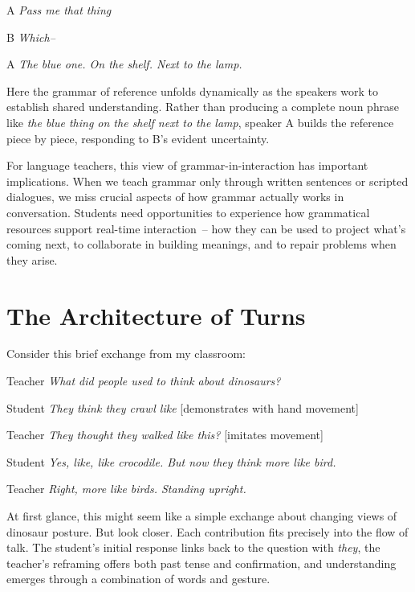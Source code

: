 \ea
\begin{dialogue}
\item[A] \textit{Pass me that thing}
\item[B] \textit{Which--}
\item[A] \textit{The blue one. On the shelf. Next to the lamp.}
\end{dialogue}
\z

Here the grammar of reference unfolds dynamically as the speakers work to establish shared understanding. Rather than producing a complete noun phrase like \textit{the blue thing on the shelf next to the lamp}, speaker A builds the reference piece by piece, responding to B's evident uncertainty.

For language teachers, this view of grammar-in-interaction has important implications. When we teach grammar only through written sentences or scripted dialogues, we miss crucial aspects of how grammar actually works in conversation. Students need opportunities to experience how grammatical resources support real-time interaction~-- how they can be used to project what's coming next, to collaborate in building meanings, and to repair problems when they arise.

\section{The Architecture of Turns} \label{sec:turn-arch}

Consider this brief exchange from my classroom:

\ea
\begin{dialogue}
\item[Teacher] \textit{What did people used to think about dinosaurs?}
\item[Student] \textit{They think they crawl like} [demonstrates with hand movement]
\item[Teacher] \textit{They thought they walked like this?} [imitates movement]
\item[Student] \textit{Yes, like, like crocodile. But now they think more like bird.}
\item[Teacher] \textit{Right, more like birds. Standing upright.}
\end{dialogue}
\z

At first glance, this might seem like a simple exchange about changing views of dinosaur posture. But look closer. Each contribution fits precisely into the flow of talk. The student's initial response links back to the question with \textit{they}, the teacher's reframing offers both past tense and confirmation, and understanding emerges through a combination of words and gesture.

